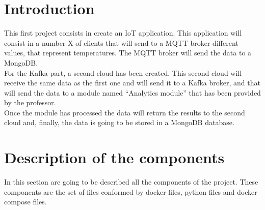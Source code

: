\documentclass[a4paper,12pt]{article}
\begin{document}
	\begin{titlepage}
		\maketitle
		\thispagestyle{empty}
	\end{titlepage}
	\cleardoublepage
	\newpage

\tableofcontents
\listoffigures
\thispagestyle{empty}

\newpage
\section*{Introduction}
This first project consists in create an IoT application. This application will consist in a number X of clients that will send to a MQTT broker different values, that represent temperatures. The MQTT broker will send the data to a MongoDB.\\
For the Kafka part, a second cloud has been created. This second cloud will receive the same data as the first one and will send it to a Kafka broker, and that will send the data to a module named “Analytics module” that has been provided by the professor.\\
Once the module has processed the data will return the results to the second cloud and, finally, the data is going to be stored in a MongoDB database.


\section*{Description of the components}
In this section are going to be described all the components of the project. These components are the set of files conformed by docker files, python files and docker compose files.
\end{document}
